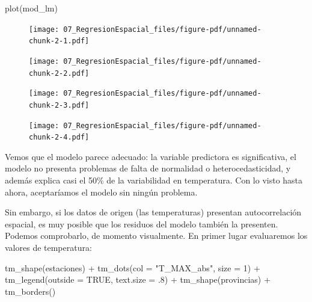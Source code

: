 \documentclass[
  letterpaper,
  DIV=11,
  numbers=noendperiod]{scrreprt}
\newenvironment{Shaded}{\begin{snugshade}}{\end{snugshade}}
\newcommand{\AttributeTok}[1]{\textcolor[rgb]{0.40,0.45,0.13}{#1}}
\newcommand{\ConstantTok}[1]{\textcolor[rgb]{0.56,0.35,0.01}{#1}}
\newcommand{\DecValTok}[1]{\textcolor[rgb]{0.68,0.00,0.00}{#1}}
\newcommand{\FunctionTok}[1]{\textcolor[rgb]{0.28,0.35,0.67}{#1}}
\newcommand{\NormalTok}[1]{\textcolor[rgb]{0.00,0.23,0.31}{#1}}
\newcommand{\SpecialCharTok}[1]{\textcolor[rgb]{0.37,0.37,0.37}{#1}}
\newcommand{\StringTok}[1]{\textcolor[rgb]{0.13,0.47,0.30}{#1}}
\begin{document}
\begin{Shaded}
\begin{Highlighting}[]
\FunctionTok{plot}\NormalTok{(mod\_lm)}
\end{Highlighting}
\end{Shaded}

\begin{figure}[H]

{\centering \texttt{[image: 07\_RegresionEspacial\_files/figure-pdf/unnamed-chunk-2-1.pdf]}

}

\end{figure}

\begin{figure}[H]

{\centering \texttt{[image: 07\_RegresionEspacial\_files/figure-pdf/unnamed-chunk-2-2.pdf]}

}

\end{figure}

\begin{figure}[H]

{\centering \texttt{[image: 07\_RegresionEspacial\_files/figure-pdf/unnamed-chunk-2-3.pdf]}

}

\end{figure}

\begin{figure}[H]

{\centering \texttt{[image: 07\_RegresionEspacial\_files/figure-pdf/unnamed-chunk-2-4.pdf]}

}

\end{figure}

Vemos que el modelo parece adecuado: la variable predictora es
significativa, el modelo no presenta problemas de falta de normalidad o
heterocedasticidad, y además explica casi el 50\% de la variabilidad en
temperatura. Con lo visto hasta ahora, aceptaríamos el modelo sin ningún
problema.

Sin embargo, si los datos de origen (las temperaturas) presentan
autocorrelación espacial, es muy posible que los residuos del modelo
también la presenten. Podemos comprobarlo, de momento visualmente. En
primer lugar evaluaremos los valores de temperatura:

\begin{Shaded}
\begin{Highlighting}[]
\FunctionTok{tm\_shape}\NormalTok{(estaciones) }\SpecialCharTok{+} 
    \FunctionTok{tm\_dots}\NormalTok{(}\AttributeTok{col =} \StringTok{"T\_MAX\_abs"}\NormalTok{, }\AttributeTok{size =} \DecValTok{1}\NormalTok{) }\SpecialCharTok{+}
    \FunctionTok{tm\_legend}\NormalTok{(}\AttributeTok{outside =} \ConstantTok{TRUE}\NormalTok{, }\AttributeTok{text.size =}\NormalTok{ .}\DecValTok{8}\NormalTok{) }\SpecialCharTok{+}
    \FunctionTok{tm\_shape}\NormalTok{(provincias) }\SpecialCharTok{+}
    \FunctionTok{tm\_borders}\NormalTok{()}
\end{Highlighting}
\end{Shaded}
\end{document}
